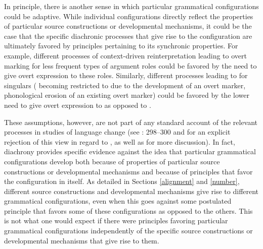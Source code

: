 \documentclass[output=paper]{langsci/langscibook}
\begin{document}
In principle, there is another sense in which particular
grammatical configurations could be adaptive. While individual
configurations directly reflect the properties of particular
source constructions or developmental mechanisms, it could be the case
that the specific diachronic processes that give rise to the configuration are ultimately
favored by principles pertaining to its synchronic properties. For example, different
processes of context-driven reinterpretation leading to overt marking for less frequent
types of argument roles could be favored by the need to
give overt expression to these roles. Similarly, different processes leading to  for singulars (
becoming restricted to  due to the development of an overt 
marker, phonological erosion of an existing overt 
marker) could be favored by the lower need to give overt
expression to  as opposed to .

These assumptions, however, 
are not part of any standard account of the relevant processes in
studies of language change (see \citealt{BybeeEtAl1994}: 298--300 and   for an explicit rejection of this view in
regard to , as well as \citealt{Otadependencies} for
more discussion).
In fact, diachrony provides specific evidence against the
idea that particular grammatical configurations develop both
because of properties of particular source constructions or developmental
mechanisms and because of
principles that favor the configuration in itself. As detailed in Sections
\ref{alignment} and \ref{number}, different source constructions and developmental mechanisms
give rise to different grammatical configurations, even when this goes
against some postulated principle that favors some of these
configurations as opposed to the others.
This is not what one would expect if there
were principles favoring particular grammatical
configurations independently of the specific source constructions or
developmental mechanisms that give rise to them.
\end{document}
